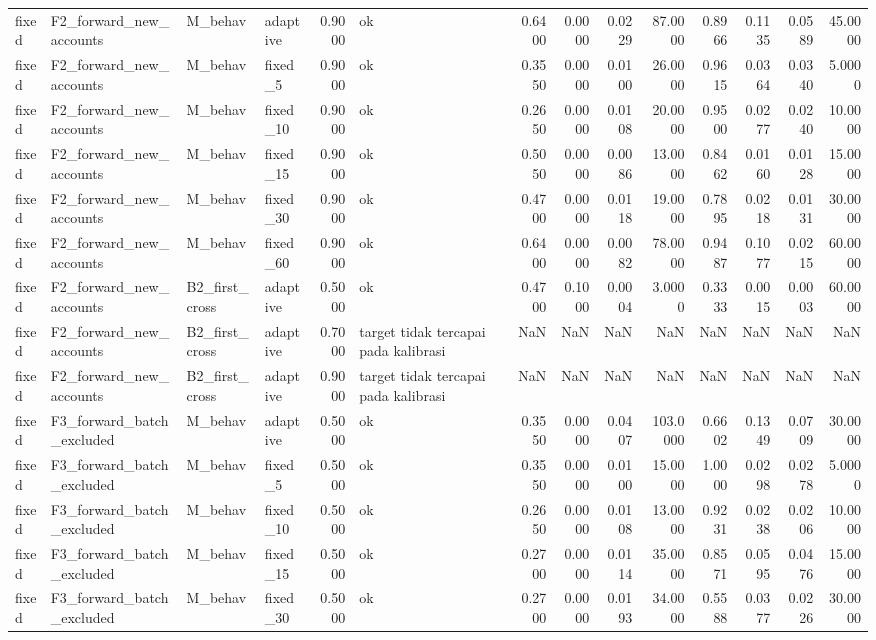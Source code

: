 \begin{table}
\begin{tabular}{llllrlrrrrrrrr}
fixed & F2\_forward\_new\_accounts & M\_behav & adaptive & 0.9000 & ok & 0.6400 & 0.0000 & 0.0229 & 87.0000 & 0.8966 & 0.1135 & 0.0589 & 45.0000 \\
fixed & F2\_forward\_new\_accounts & M\_behav & fixed\_5 & 0.9000 & ok & 0.3550 & 0.0000 & 0.0100 & 26.0000 & 0.9615 & 0.0364 & 0.0340 & 5.0000 \\
fixed & F2\_forward\_new\_accounts & M\_behav & fixed\_10 & 0.9000 & ok & 0.2650 & 0.0000 & 0.0108 & 20.0000 & 0.9500 & 0.0277 & 0.0240 & 10.0000 \\
fixed & F2\_forward\_new\_accounts & M\_behav & fixed\_15 & 0.9000 & ok & 0.5050 & 0.0000 & 0.0086 & 13.0000 & 0.8462 & 0.0160 & 0.0128 & 15.0000 \\
fixed & F2\_forward\_new\_accounts & M\_behav & fixed\_30 & 0.9000 & ok & 0.4700 & 0.0000 & 0.0118 & 19.0000 & 0.7895 & 0.0218 & 0.0131 & 30.0000 \\
fixed & F2\_forward\_new\_accounts & M\_behav & fixed\_60 & 0.9000 & ok & 0.6400 & 0.0000 & 0.0082 & 78.0000 & 0.9487 & 0.1077 & 0.0215 & 60.0000 \\
fixed & F2\_forward\_new\_accounts & B2\_first\_cross & adaptive & 0.5000 & ok & 0.4700 & 0.1000 & 0.0004 & 3.0000 & 0.3333 & 0.0015 & 0.0003 & 60.0000 \\
fixed & F2\_forward\_new\_accounts & B2\_first\_cross & adaptive & 0.7000 & target tidak tercapai pada kalibrasi & NaN & NaN & NaN & NaN & NaN & NaN & NaN & NaN \\
fixed & F2\_forward\_new\_accounts & B2\_first\_cross & adaptive & 0.9000 & target tidak tercapai pada kalibrasi & NaN & NaN & NaN & NaN & NaN & NaN & NaN & NaN \\
fixed & F3\_forward\_batch\_excluded & M\_behav & adaptive & 0.5000 & ok & 0.3550 & 0.0000 & 0.0407 & 103.0000 & 0.6602 & 0.1349 & 0.0709 & 30.0000 \\
fixed & F3\_forward\_batch\_excluded & M\_behav & fixed\_5 & 0.5000 & ok & 0.3550 & 0.0000 & 0.0100 & 15.0000 & 1.0000 & 0.0298 & 0.0278 & 5.0000 \\
fixed & F3\_forward\_batch\_excluded & M\_behav & fixed\_10 & 0.5000 & ok & 0.2650 & 0.0000 & 0.0108 & 13.0000 & 0.9231 & 0.0238 & 0.0206 & 10.0000 \\
fixed & F3\_forward\_batch\_excluded & M\_behav & fixed\_15 & 0.5000 & ok & 0.2700 & 0.0000 & 0.0114 & 35.0000 & 0.8571 & 0.0595 & 0.0476 & 15.0000 \\
fixed & F3\_forward\_batch\_excluded & M\_behav & fixed\_30 & 0.5000 & ok & 0.2700 & 0.0000 & 0.0193 & 34.0000 & 0.5588 & 0.0377 & 0.0226 & 30.0000 \\

\end{tabular}
\end{table}

